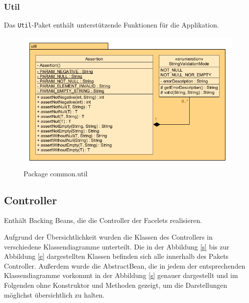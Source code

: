 
\newpage
\subsubsection{Util}

Das \texttt{Util}-Paket enthält unterstützende Funktionen für die Applikation.

\begin{figure}[H]
	\centering
  \includegraphics[width=\textwidth]{../UMLDiagramme/common/util/gfx/4_package_util.png}
	\caption{Package common.util}
\end{figure}


\newpage
\subsection{Controller}

Enthält Backing Beans, die die Controller der Facelets realisieren.

Aufgrund der Übersichtlichkeit wurden die Klassen des Controllers in verschiedene Klassendiagramme unterteilt. Die in der Abbildung \ref{s} bis zur Abbildung \ref{e} dargestellten Klassen befinden sich alle innerhalb des Pakets Controller. Außerdem wurde die AbstractBean, die in jedem der entsprechenden Klassendiagramme vorkommt in der Abbildung \ref{s} genauer dargestellt und im Folgenden ohne Konstruktor und Methoden gezeigt, um die Darstellungen möglichst übersichtlich zu halten.

